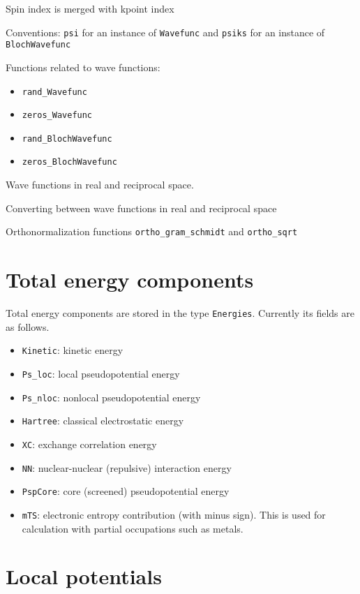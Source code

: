 \documentclass[a4paper,10pt]{paper}
\newcommand{\jlcode}[1]{\texttt{#1}}
\begin{document}
Spin index is merged with kpoint index

Conventions: \jlcode{psi} for an instance of \jlcode{Wavefunc} and
\jlcode{psiks} for an instance of \jlcode{BlochWavefunc}

Functions related to wave functions:
\begin{itemize}
\item \jlcode{rand_Wavefunc}
\item \jlcode{zeros_Wavefunc}
\item \jlcode{rand_BlochWavefunc}
\item \jlcode{zeros_BlochWavefunc}
\end{itemize}

Wave functions in real and reciprocal space.

Converting between wave functions in real and reciprocal space

Orthonormalization functions
\jlcode{ortho_gram_schmidt} and \jlcode{ortho_sqrt}


\section{Total energy components}

Total energy components are stored in the type \jlcode{Energies}. Currently its
fields are as follows.
\begin{itemize}
%
\item \jlcode{Kinetic}: kinetic energy
%
\item \jlcode{Ps_loc}: local pseudopotential energy
%
\item \jlcode{Ps_nloc}: nonlocal pseudopotential energy
%
\item \jlcode{Hartree}: classical electrostatic energy
%
\item \jlcode{XC}: exchange correlation energy
%
\item \jlcode{NN}: nuclear-nuclear (repulsive) interaction energy
%
\item \jlcode{PspCore}: core (screened) pseudopotential energy
%
\item \jlcode{mTS}: electronic entropy contribution (with minus sign). This is
  used for calculation with partial occupations such as metals.
%
\end{itemize}


\section{Local potentials}
\end{document}
